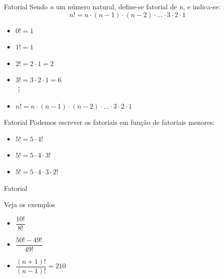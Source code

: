 \documentclass[aspectratio=169,xcolor=dvipsnames]{beamer}
\begin{document}
\begin{frame}{Fatorial}
    Sendo \textit{n} um número natural, define-se fatorial de \textit{n}, e indica-se:
    \begin{equation*}
        n! = n \cdot (n -1) \cdot (n-2) \cdot \dots \cdot 3 \cdot 2 \cdot 1
    \end{equation*}

    \begin{itemize}
        \item $0! = 1$
        \item $1! = 1$
        \item $2! = 2 \cdot 1 = 2$
        \item $3! = 3 \cdot 2 \cdot 1 = 6$ \\ \hspace{1cm} \vdots
        \item $n! = n \cdot (n -1) \cdot (n - 2) \cdot \dots \cdot 3 \cdot 2 \cdot 1$
    \end{itemize}

\end{frame}


\begin{frame}{Fatorial}
    Podemos escrever os fatoriais em função de fatoriais menores:

    \begin{itemize}
        \item $5! = 5 \cdot 4!$
        \item $5! = 5 \cdot 4 \cdot 3!$
        \item $5! = 5 \cdot 4 \cdot 3 \cdot  2!$
    \end{itemize}
\end{frame}


\begin{frame}{Fatorial}
    \begin{center}
        Veja os exemplos
    \end{center}

    \begin{itemize}
        \setlength\itemsep{1em}
        \item $\dfrac{10!}{8!}$
        \item $\dfrac{50! - 49!}{49!}$
        \item $\dfrac{(n+1)!}{(n-1)!} = 210$
    \end{itemize}

\end{frame}
\end{document}
